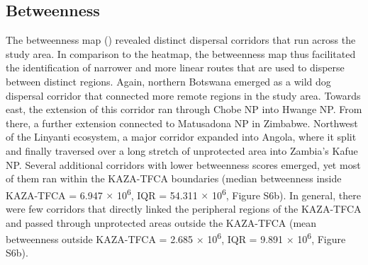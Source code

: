 \documentclass[abstract=on,10pt,a4paper,bibliography=totocnumbered]{article}
\begin{document}
\subsection{Betweenness}
The betweenness map () revealed distinct dispersal corridors
that run across the study area. In comparison to the heatmap, the betweenness
map thus facilitated the identification of narrower and more linear routes that
are used to disperse between distinct regions. Again, northern Botswana emerged
as a wild dog dispersal corridor that connected more remote regions in the study
area. Towards east, the extension of this corridor ran through Chobe NP into
Hwange NP. From there, a further extension connected to Matusadona NP in
Zimbabwe. Northwest of the Linyanti ecosystem, a major corridor expanded into
Angola, where it split and finally traversed over a long stretch of unprotected
area into Zambia's Kafue NP. Several additional corridors with lower betweenness
scores emerged, yet most of them ran within the KAZA-TFCA boundaries (median
betweenness inside KAZA-TFCA = 6.947 \(\times\) 10\textsuperscript{6}, IQR =
54.311 \(\times\) 10\textsuperscript{6}, Figure S6b). In general, there were few
corridors that directly linked the peripheral regions of the KAZA-TFCA and
passed through unprotected areas outside the KAZA-TFCA (mean betweenness outside
KAZA-TFCA = 2.685 \(\times\) 10\textsuperscript{6}, IQR = 9.891 \(\times\)
10\textsuperscript{6}, Figure S6b).

\end{document}
